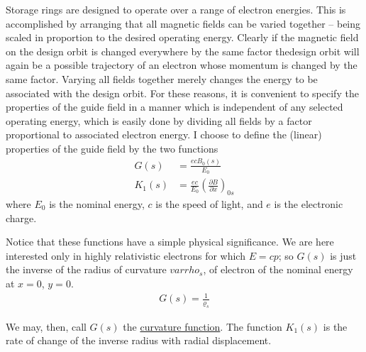 Storage rings are designed to operate over a range of electron energies. This is accomplished  by arranging that all magnetic fields can be varied together -- being scaled in proportion to the desired operating energy. Clearly if the magnetic field on the design orbit is changed everywhere by the same factor thedesign orbit will again be a possible trajectory of an electron whose momentum is changed by the same factor. Varying all fields together merely changes the energy to be associated with the design orbit. For these reasons, it is convenient to specify the properties of the guide field in a manner which is independent of any selected operating energy, which is easily done by dividing all fields by a factor proportional to associated electron energy. I choose to define the (linear) properties of the guide field by the two functions
\begin{align}\label{eq:2.3}
	G(s) &= \frac{ecB_0(s)}{E_0}\\
	K_1(s) &= \frac{ec}{E_0} \left(\frac{\partial B}{\partial x}\right)_{0s} \label{eq:2.4}
\end{align}
where $E_0$ is the nominal energy, $c$ is the speed of light, and $e$ is the electronic charge.

Notice that these functions have a simple physical significance. We are here interested only in highly relativistic electrons for which $E = cp$; so $G(s)$ is just the inverse of the radius of curvature $varrho_s$, of electron of the nominal energy at $x = 0$, $y = 0$.
\begin{align}
	G(s) = \frac{1}{\varrho_s}
\end{align}

We may, then, call $G(s)$ the \underline{curvature function}. The function $K_1(s)$ is the rate of change of the inverse radius with radial displacement.

